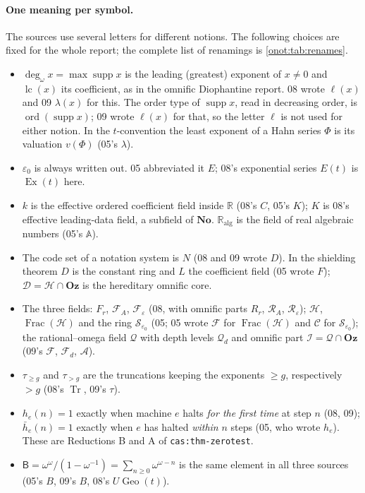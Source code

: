 \documentclass[11pt,oneside]{article}
\numberwithin{equation}{section}
\theoremstyle{definition}
\theoremstyle{remark}
\newcommand{\No}{\mathbf{No}}
\newcommand{\Oz}{\mathbf{Oz}}
\newcommand{\R}{\mathbb R}
\newcommand{\Ralg}{\R_{\mathrm{alg}}}
\newcommand{\Hh}{\mathcal H}
\newcommand{\Dd}{\mathcal D}
\newcommand{\FH}{\operatorname{Frac}(\mathcal H)}
\newcommand{\SE}{\mathcal S_{\varepsilon_0}}
\newcommand{\QO}{\mathcal Q}
\newcommand{\IO}{\mathcal I}
\newcommand{\sB}{\mathsf B}
\newcommand{\supp}{\operatorname{supp}}
\newcommand{\lc}{\operatorname{lc}}
\newcommand{\ddeg}{\operatorname{deg}_{\omega}}
\newcommand{\ord}{\operatorname{ord}}
\newcommand{\Ex}{\operatorname{Ex}}
\newcommand{\Geo}{\operatorname{Geo}}
\newcommand{\tr}[1]{\tau_{\ge #1}}
\newcommand{\trs}[1]{\tau_{> #1}}
\newcommand{\hb}{\bar h}
\newcommand{\replabel}[1]{\nolinkurl{#1}}
\begin{document}
\paragraph{One meaning per symbol.} The sources use several letters for
different notions. The following choices are fixed for the whole report; the
complete list of renamings is \cref{onot:tab:renames}.
\begin{itemize}[leftmargin=*]
\item $\ddeg x=\max\supp x$ is the leading (greatest) exponent of $x\neq0$ and
$\lc(x)$ its coefficient, as in the omnific Diophantine report. 08 wrote
$\ell(x)$ and 09 $\lambda(x)$ for this. The order type of $\supp x$, read in
decreasing order, is $\ord(\supp x)$; 09 wrote $\ell(x)$ for that, so the letter
$\ell$ is not used for either notion. In the $t$-convention the least exponent of
a Hahn series $\Phi$ is its valuation $v(\Phi)$ (05's $\lambda$).
\item $\varepsilon_0$ is always written out. 05 abbreviated it $E$; 08's
exponential series $E(t)$ is $\Ex(t)$ here.
\item $k$ is the effective ordered coefficient field inside $\R$ (08's $C$, 05's
$K$); $K$ is 08's effective leading-data field, a subfield of $\No$. $\Ralg$ is the
field of real algebraic numbers (05's $\mathbb A$).
\item The code set of a notation system is $N$ (08 and 09 wrote $D$). In the
shielding theorem $D$ is the constant ring and $L$ the coefficient field (05
wrote $F$); $\Dd=\Hh\cap\Oz$ is the hereditary omnific core.
\item The three fields: $F_r$, $\mathcal F_A$, $\mathcal F_\varepsilon$ (08, with
omnific parts $R_r$, $\mathcal R_A$, $\mathcal R_\varepsilon$); $\Hh$, $\FH$ and
the ring $\SE$ (05; 05 wrote $\mathcal F$ for $\FH$ and $\mathcal C$ for $\SE$);
the rational--omega field $\QO$ with depth levels $\QO_d$ and omnific part
$\IO=\QO\cap\Oz$ (09's $\mathcal F$, $\mathcal F_d$, $\mathcal A$).
\item $\tr g$ and $\trs g$ are the truncations keeping the exponents $\ge g$,
respectively $>g$ (08's $\operatorname{Tr}$, 09's $\tau$).
\item $h_e(n)=1$ exactly when machine $e$ halts \emph{for the first time} at
step $n$ (08, 09); $\hb_e(n)=1$ exactly when $e$ has halted \emph{within} $n$
steps (05, who wrote $h_e$). These are Reductions B and A of
\replabel{cas:thm-zerotest}.
\item $\sB=\omega^\omega/(1-\omega^{-1})=\sum_{n\ge0}\omega^{\omega-n}$ is the
same element in all three sources (05's $B$, 09's $B$, 08's $U\Geo(t)$).
\end{itemize}
\end{document}
